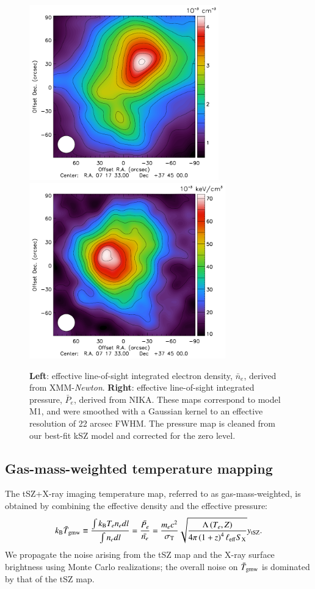 \documentclass[twocolumn,traditabstract]{aa}
\begin{document}
\begin{figure}[h]
\centering
\includegraphics[height=7.6cm]{Figure/Thermo_N1.pdf}
\includegraphics[height=7.6cm]{Figure/Thermo_Pclean1.pdf}
\caption{\footnotesize{{\bf Left}: effective line-of-sight integrated electron density, $\bar{n}_e$, derived from XMM-\textit{Newton}. {\bf Right}: effective line-of-sight integrated pressure, $\bar{P}_e$, derived from NIKA. These maps correspond to model M1, and were smoothed with a Gaussian kernel to an effective resolution of 22 arcsec FWHM. The pressure map is cleaned from our best-fit kSZ model and corrected for the zero level.}}
\label{fig:Input_maps}
\end{figure}

\subsection{Gas-mass-weighted temperature mapping}
The tSZ+X-ray imaging temperature map, referred to as gas-mass-weighted, is obtained by combining the effective density and the effective pressure: 
\begin{equation}
	k_{\rm B} \bar{T}_{\rm gmw} \equiv \frac{\int k_{\rm B} T_e n_e dl}{\int n_e dl} = \frac{\bar{P_e}}{\bar{n_e}} = \frac{m_e c^2}{\sigma_{\rm T}} \sqrt{\frac{\Lambda\left(T_e, Z\right)}{4 \pi \left(1+z\right)^4 \ell_{\rm eff} S_{\rm X}}} y_{\rm tSZ}.
\label{eq:pseudo_tsz}
\end{equation}
We propagate the noise arising from the tSZ map and the X-ray surface brightness using Monte Carlo realizations; the overall noise on $\bar{T}_{\rm gmw}$ is dominated by that of the tSZ map.
\end{document}
